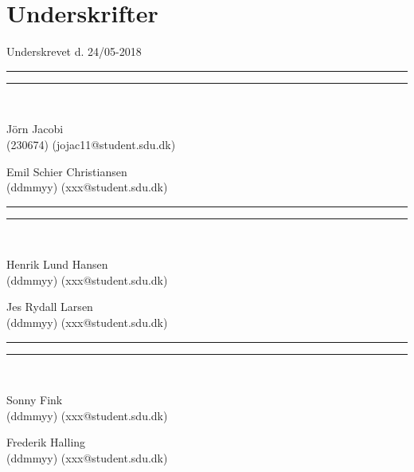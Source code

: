 
\section*{Underskrifter}
\vspace{3ex} \hfill Underskrevet d. 24/05-2018\\

\newlength{\streg} \setlength{\streg}{0.49\linewidth}
\vspace*{\fill} \rule{\streg}{1pt} \hfill \rule{\streg}{1pt}\\
\begin{minipage}[b]{\streg}
 \centering
 \rule{0pt}{4ex}
 J\"{o}rn Jacobi \\
 {\footnotesize (230674) (jojac11@student.sdu.dk)}
\end{minipage}
\hfill
\begin{minipage}[b]{\streg}
 \centering
 Emil Schier Christiansen \\
 {\footnotesize (ddmmyy) (xxx@student.sdu.dk)}
\end{minipage}

\vspace*{\fill} \rule{\streg}{1pt} \hfill \rule{\streg}{1pt}\\
\begin{minipage}[b]{\streg}
 \centering
 \rule{0pt}{4ex}
 Henrik Lund Hansen \\
 {\footnotesize (ddmmyy) (xxx@student.sdu.dk)}
\end{minipage}
\hfill
\begin{minipage}[b]{\streg}
 \centering
 Jes Rydall Larsen \\
 {\footnotesize (ddmmyy) (xxx@student.sdu.dk)}
\end{minipage}

\vspace*{\fill} \rule{\streg}{1pt} \hfill \rule{\streg}{1pt}\\
\begin{minipage}[b]{\streg}
	\centering
	\rule{0pt}{4ex}
	Sonny Fink \\
	{\footnotesize (ddmmyy) (xxx@student.sdu.dk)}
\end{minipage}
\hfill
\begin{minipage}[b]{\streg}
	\centering
	Frederik Halling  \\
	{\footnotesize (ddmmyy) (xxx@student.sdu.dk)}
\end{minipage}